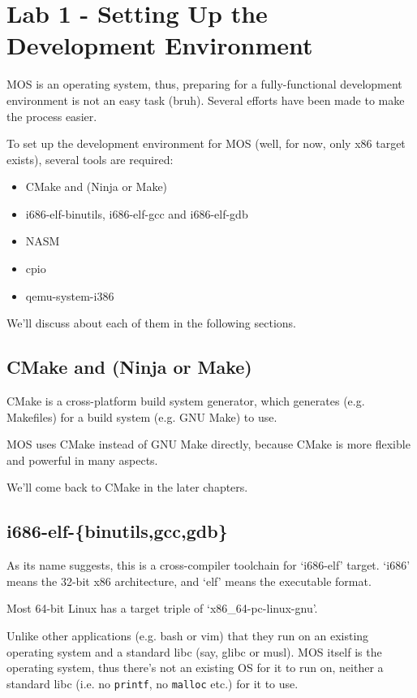 \chapter{Lab 1 - Setting Up the Development Environment}

MOS is an operating system, thus, preparing for a fully-functional development
environment is not an easy task (bruh). Several efforts have been made to make
the process easier.

To set up the development environment for MOS (well, for now, only x86 target exists),
several tools are required:

\begin{itemize}
    \item CMake and (Ninja or Make)
    \item i686-elf-binutils, i686-elf-gcc and i686-elf-gdb
    \item NASM
    \item cpio
    \item qemu-system-i386
\end{itemize}

We'll discuss about each of them in the following sections.

\section{CMake and (Ninja or Make)}

CMake is a cross-platform build system generator, which generates (e.g. Makefiles)
for a build system (e.g. GNU Make) to use.

MOS uses CMake instead of GNU Make directly, because CMake is more flexible and
powerful in many aspects.

We'll come back to CMake in the later chapters.

\section{i686-elf-\{binutils,gcc,gdb\}}

As its name suggests, this is a cross-compiler toolchain for `i686-elf' target.
`i686' means the 32-bit x86 architecture, and `elf' means the executable format.

\begin{tip}
    Most 64-bit Linux has a target triple of `x86\_64-pc-linux-gnu'.
\end{tip}

Unlike other applications (e.g. bash or vim) that they run on an existing operating
system and a standard libc (say, glibc or musl). MOS itself is the operating system,
thus there's not an existing OS for it to run on, neither a standard libc (i.e. no
\texttt{printf}, no \texttt{malloc} etc.) for it to use.

